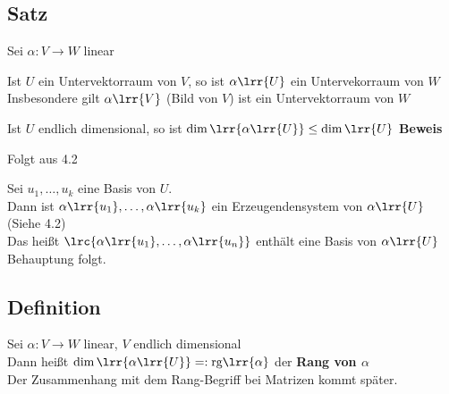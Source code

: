 \subsection{Satz}
	Sei $\alpha:V\rightarrow W$ linear
		\item Ist $U$ ein Untervektorraum von $V$, so ist $\alpha\lrr{U}$ ein Untervekorraum von $W$\\
			Insbesondere gilt $\alpha\lrr{V}$ (Bild von $V$) ist ein Untervektorraum von $W$
		\item Ist $U$ endlich dimensional, so ist $\dim\lrr{\alpha\lrr{U}}\leq\dim\lrr{U}$
	\subExEnd
	\textbf{Beweis}
		\item Folgt aus 4.2
		\item Sei $u_1,\dots,u_k$ eine Basis von $U$.\\
			Dann ist $\alpha\lrr{u_1},\dots,\alpha\lrr{u_k}$ ein Erzeugendensystem von $\alpha\lrr{U}$ (Siehe 4.2)\\
			Das heißt $\lrc{\alpha\lrr{u_1},\dots,\alpha\lrr{u_n}}$ enthält eine Basis von $\alpha\lrr{U}$ Behauptung folgt.
	\subExEnd
	
\subsection{Definition}
	Sei $\alpha:V\rightarrow W$ linear, $V$ endlich dimensional\\
	Dann heißt $\dim\lrr{\alpha\lrr{U}}=:\mbox{rg}\lrr{\alpha}$ der \textbf{Rang von $\alpha$}\\
	Der Zusammenhang mit dem Rang-Begriff bei Matrizen kommt später.
	

